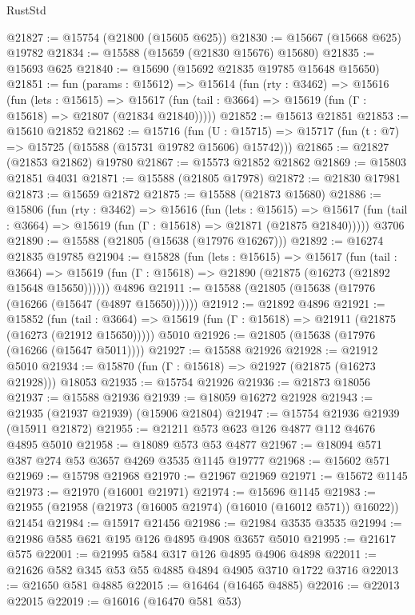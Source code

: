 \begin{lexlean}{RustStd}
\begin{coremodule}
@21827 := @15754 (@21800 (@15605 @625))
@21830 := @15667 (@15668 @625) @19782
@21834 := @15588 (@15659 (@21830 @15676) @15680)
@21835 := @15693 @625
@21840 := @15690 (@15692 @21835 @19785 @15648 @15650)
@21851 := fun (params : @15612) =>
  @15614
    (fun (rty : @3462) =>
    @15616
      (fun (lets : @15615) =>
      @15617 (fun (tail : @3664) => @15619 (fun (Γ : @15618) => @21807 (@21834 @21840)))))
@21852 := @15613 @21851
@21853 := @15610 @21852
@21862 := @15716
    (fun (U : @15715) => @15717 (fun (t : @7) => @15725 (@15588 (@15731 @19782 @15606) @15742)))
@21865 := @21827 (@21853 @21862) @19780
@21867 := @15573 @21852 @21862
@21869 := @15803 @21851 @4031
@21871 := @15588 (@21805 @17978)
@21872 := @21830 @17981
@21873 := @15659 @21872
@21875 := @15588 (@21873 @15680)
@21886 := @15806
    (fun (rty : @3462) =>
    @15616
      (fun (lets : @15615) =>
      @15617 (fun (tail : @3664) => @15619 (fun (Γ : @15618) => @21871 (@21875 @21840)))))
    @3706
@21890 := @15588 (@21805 (@15638 (@17976 @16267)))
@21892 := @16274 @21835 @19785
@21904 := @15828
    (fun (lets : @15615) =>
    @15617
      (fun (tail : @3664) =>
      @15619 (fun (Γ : @15618) => @21890 (@21875 (@16273 (@21892 @15648 @15650))))))
    @4896
@21911 := @15588 (@21805 (@15638 (@17976 (@16266 (@15647 (@4897 @15650))))))
@21912 := @21892 @4896
@21921 := @15852
    (fun (tail : @3664) => @15619 (fun (Γ : @15618) => @21911 (@21875 (@16273 (@21912 @15650)))))
    @5010
@21926 := @21805 (@15638 (@17976 (@16266 (@15647 @5011))))
@21927 := @15588 @21926
@21928 := @21912 @5010
@21934 := @15870 (fun (Γ : @15618) => @21927 (@21875 (@16273 @21928))) @18053
@21935 := @15754 @21926
@21936 := @21873 @18056
@21937 := @15588 @21936
@21939 := @18059 @16272 @21928
@21943 := @21935 (@21937 @21939) (@15906 @21804)
@21947 := @15754 @21936 @21939 (@15911 @21872)
@21955 := @21211 @573 @623 @126 @4877 @112 @4676 @4895 @5010
@21958 := @18089 @573 @53 @4877
@21967 := @18094 @571 @387 @274 @53 @3657 @4269 @3535 @1145 @19777
@21968 := @15602 @571
@21969 := @15798 @21968
@21970 := @21967 @21969
@21971 := @15672 @1145
@21973 := @21970 (@16001 @21971)
@21974 := @15696 @1145
@21983 := @21955 (@21958 (@21973 (@16005 @21974) (@16010 (@16012 @571)) @16022)) @21454
@21984 := @15917 @21456
@21986 := @21984 @3535 @3535
@21994 := @21986 @585 @621 @195 @126 @4895 @4908 @3657 @5010
@21995 := @21617 @575
@22001 := @21995 @584 @317 @126 @4895 @4906 @4898
@22011 := @21626 @582 @345 @53 @55 @4885 @4894 @4905 @3710 @1722 @3716
@22013 := @21650 @581 @4885
@22015 := @16464 (@16465 @4885)
@22016 := @22013 @22015
@22019 := @16016 (@16470 @581 @53)

\end{coremodule}
\end{lexlean}
